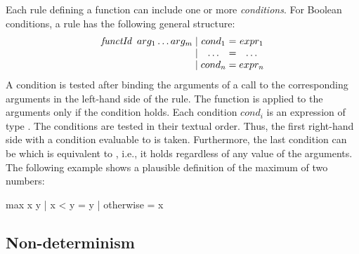 Each rule defining a function
can include one or more \emph{conditions}.
For Boolean conditions, a rule has the following general
structure:
%
\[
\begin{array}{@{} l @{\;|\;} c @{\;=\;} c @{}}
\emph{functId} \;\; arg_1 \ldots arg_m & cond_1 & expr_1 \\
                           & \ldots & \ldots \\
                           & cond_n & expr_n
\end{array}
\]
%
A condition is tested after binding
the arguments of a call to the corresponding arguments
in the left-hand side of the rule.
The function is applied to the arguments only if the condition holds.
%
Each condition $cond_i$ is an expression of type .
The conditions are tested in their textual order.
Thus, the first right-hand side with a condition evaluable to 
is taken. Furthermore, the last condition can be
 which is equivalent to ,
i.e., it holds regardless of any value of the arguments.
%
The following example shows a plausible definition of the maximum
of two numbers:
%
\begin{prog}
max x y | x < y     = y
        | otherwise = x
\end{prog}
%


\subsection{Non-determinism}
\label{Non-determinism}

